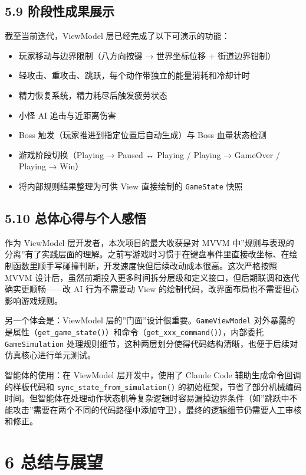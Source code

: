 \documentclass[12pt,fontset=none]{ctexart}
\begin{document}
\subsection{5.9 阶段性成果展示}

截至当前迭代，ViewModel 层已经完成了以下可演示的功能：

\begin{itemize}
\item 玩家移动与边界限制（八方向按键 → 世界坐标位移 + 街道边界钳制）
\item 轻攻击、重攻击、跳跃，每个动作带独立的能量消耗和冷却计时
\item 精力恢复系统，精力耗尽后触发疲劳状态
\item 小怪 AI 追击与近距离伤害
\item Boss 触发（玩家推进到指定位置后自动生成）与 Boss 血量状态检测
\item 游戏阶段切换（Playing → Paused ↔ Playing / Playing → GameOver / Playing → Win）
\item 将内部规则结果整理为可供 View 直接绘制的 \texttt{GameState} 快照
\end{itemize}

\subsection{5.10 总体心得与个人感悟}

作为 ViewModel 层开发者，本次项目的最大收获是对 MVVM 中”规则与表现的分离”有了实践层面的理解。之前写游戏时习惯于在键盘事件里直接改坐标、在绘制函数里顺手写碰撞判断，开发速度快但后续改动成本很高。这次严格按照 MVVM 设计后，虽然前期投入更多时间拆分层级和定义接口，但后期联调和迭代确实更顺畅——改 AI 行为不需要动 View 的绘制代码，改界面布局也不需要担心影响游戏规则。

另一个体会是：ViewModel 层的”门面”设计很重要。\texttt{GameViewModel} 对外暴露的是属性（\texttt{get\_game\_state()}）和命令（\texttt{get\_xxx\_command()}），内部委托 \texttt{GameSimulation} 处理规则细节，这种两层划分使得代码结构清晰，也便于后续对仿真核心进行单元测试。

智能体的使用：在 ViewModel 层开发中，使用了 Claude Code 辅助生成命令回调的样板代码和 \texttt{sync\_state\_from\_simulation()} 的初始框架，节省了部分机械编码时间。但智能体在处理动作状态机等复杂逻辑时容易漏掉边界条件（如”跳跃中不能攻击”需要在两个不同的代码路径中添加守卫），最终的逻辑细节仍需要人工审核和修正。

\section{6 总结与展望}
\end{document}
